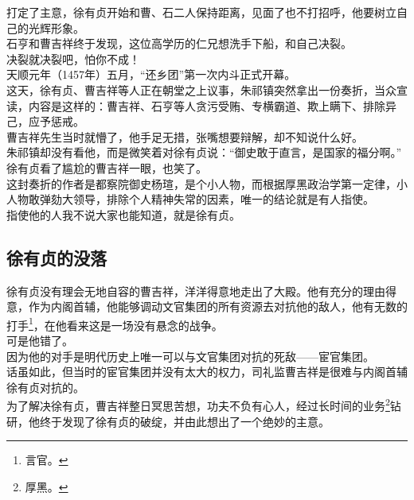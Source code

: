 \begin{multicols}{\theparacolNo}
打定了主意，徐有贞开始和曹、石二人保持距离，见面了也不打招呼，他要树立自己的光辉形象。\\

石亨和曹吉祥终于发现，这位高学历的仁兄想洗手下船，和自己决裂。\\

决裂就决裂吧，怕你不成！\\

天顺元年（1457年）五月，“还乡团”第一次内斗正式开幕。\\

这天，徐有贞、曹吉祥等人正在朝堂之上议事，朱祁镇突然拿出一份奏折，当众宣读，内容是这样的：曹吉祥、石亨等人贪污受贿、专横霸道、欺上瞒下、排除异己，应予惩戒。\\

曹吉祥先生当时就懵了，他手足无措，张嘴想要辩解，却不知说什么好。\\

朱祁镇却没有看他，而是微笑着对徐有贞说：“御史敢于直言，是国家的福分啊。”\\

徐有贞看了尴尬的曹吉祥一眼，也笑了。\\

这封奏折的作者是都察院御史杨瑄，是个小人物，而根据厚黑政治学第一定律，小人物敢弹劾大领导，排除个人精神失常的因素，唯一的结论就是有人指使。\\

指使他的人我不说大家也能知道，就是徐有贞。\\

\subsection{徐有贞的没落}
徐有贞没有理会无地自容的曹吉祥，洋洋得意地走出了大殿。他有充分的理由得意，作为内阁首辅，他能够调动文官集团的所有资源去对抗他的敌人，他有无数的打手\footnote{言官。}，在他看来这是一场没有悬念的战争。\\

可是他错了。\\

因为他的对手是明代历史上唯一可以与文官集团对抗的死敌——宦官集团。\\

话虽如此，但当时的宦官集团并没有太大的权力，司礼监曹吉祥是很难与内阁首辅徐有贞对抗的。\\

为了解决徐有贞，曹吉祥整日冥思苦想，功夫不负有心人，经过长时间的业务\footnote{厚黑。}钻研，他终于发现了徐有贞的破绽，并由此想出了一个绝妙的主意。\\


\end{multicols}
